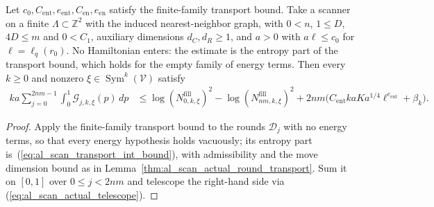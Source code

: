 \begin{lemma}
    \label{thm:al_scan_actual_round_entropy}
    \leanok
    Let $c_0,C_{\mathrm{ent}},e_{\mathrm{ent}},C_{\mathrm{en}},e_{\mathrm{en}}$
    satisfy the finite-family transport bound. Take a scanner on a finite
    $\Lambda\subset\mathbb Z^2$ with the induced nearest-neighbor graph, with
    $0<n$, $1\le D$, $4D\le m$ and $0<C_1$, auxiliary dimensions
    $d_C,d_R\ge1$, and $a>0$ with $a\ell\le c_0$ for $\ell=\ell_q(r_0)$.
    No Hamiltonian enters: the estimate is the entropy part of the transport
    bound, which holds for the empty family of energy terms. Then
    every $k\ge0$ and nonzero $\xi\in\operatorname{Sym}^k(\mathcal V)$ satisfy
    \begin{align}
        ka\sum_{j=0}^{2nm-1}\int_0^1
        \mathcal G_{j,k,\xi}(p)\,dp
         & \le \log (N^{\mathrm{fill}}_{0,k,\xi})^2
        -\log (N^{\mathrm{fill}}_{nm,k,\xi})^2
        +2nm\bigl(C_{\mathrm{ent}}kaK a^{1/4}
        \ell^{e_{\mathrm{ent}}}+\beta_k\bigr).
        \label{eq:al_scan_actual_entropy_sum}
    \end{align}
\end{lemma}
\begin{proof}\leanok
    Apply the finite-family transport bound to the rounds $\mathscr D_j$ with
    no energy terms, so that every energy hypothesis holds vacuously; its
    entropy part is~(\ref{eq:al_scan_transport_int_bound}), with admissibility
    and the move dimension bound as in
    Lemma~\ref{thm:al_scan_actual_round_transport}. Sum it on $[0,1]$ over
    $0\le j<2nm$ and telescope the right-hand side via
    (\ref{eq:al_scan_actual_telescope}).
\end{proof}

